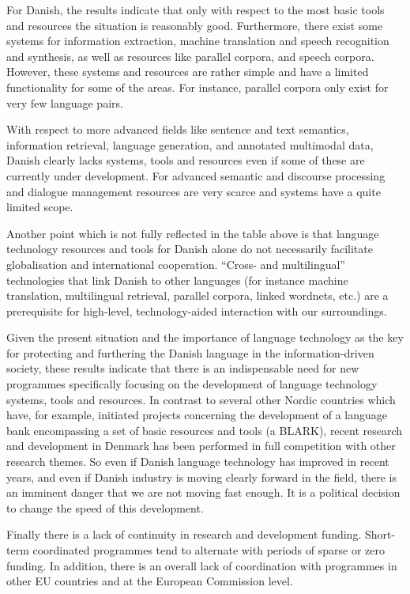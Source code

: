 \begin{multicols}{2}
For Danish, the results indicate that only with respect to the most basic tools and resources the situation is reasonably good. Furthermore, there exist some systems for information extraction, machine translation and speech recognition and synthesis, as well as resources like parallel corpora, and speech corpora. However, these systems and resources are rather simple and have a limited functionality for some of the areas. For instance, parallel corpora only exist for very few language pairs.

With respect to more advanced fields like sentence and text semantics, information retrieval, language generation, and annotated multimodal data, Danish clearly lacks systems, tools and resources even if some of these are currently under development. For advanced semantic and discourse processing and  dialogue management resources are very scarce and systems have a quite limited scope.

Another point which is not fully reflected in the table above is that language technology resources and tools for Danish alone do not necessarily facilitate globalisation and international cooperation. ``Cross- and multilingual'' technologies that link Danish to other languages (for instance machine translation, multilingual retrieval, parallel corpora, linked wordnets, etc.) are a prerequisite for high-level, technology-aided interaction with our surroundings. 

Given the present situation and the importance of language technology as the key for protecting and furthering the Danish language in the information-driven society, these results indicate that there is an indispensable need for new programmes specifically focusing on the development of language technology systems, tools and resources. In contrast to several other Nordic countries which have, for example,  initiated projects concerning the development of a language bank encompassing a set of basic resources and tools (a BLARK), recent research and development in Denmark has been performed in full competition with other research themes.  So even if Danish language technology has improved in recent years, and even if Danish industry is moving clearly forward in the field, there is an imminent danger that we are not moving fast enough. It is a political decision to change the speed of this development.

Finally there is a lack of continuity in research and development funding. Short-term coordinated programmes tend to alternate with periods of sparse or zero funding. In addition, there is an overall lack of coordination with programmes in other EU countries and at the European Commission level.


\end{multicols}
